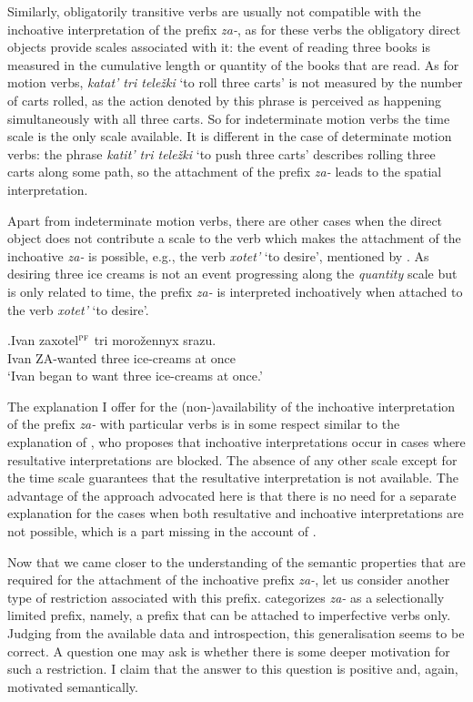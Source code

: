 Similarly, obligatorily transitive verbs are usually not compatible with the inchoative interpretation of the prefix \textit{za-}, as for these verbs the obligatory direct objects provide scales associated with it: the event of reading three books is measured in the cumulative length or quantity of the books that are read. As for motion verbs, \textit{katat' tri tele\v{z}ki} `to roll three carts' is not measured by the number of carts rolled, as the action denoted by this phrase is perceived as happening simultaneously with all three carts. So for indeterminate motion verbs the time scale is the only scale available. It is different in the case of determinate motion verbs: the phrase \textit{katit' tri tele\v{z}ki} `to push three carts' describes rolling three carts along some path, so the attachment of the prefix \textit{za-} leads to the spatial interpretation.

Apart from indeterminate motion verbs, there are other cases when the direct object does not contribute a scale to the verb which makes the attachment of the inchoative \textit{za-} is possible, e.g., the verb \textit{xotet'} `to desire', mentioned by \citet{Braginsky:08}. As desiring three ice creams is not an event progressing along the \textit{quantity} scale but is only related to time, the prefix \textit{za-} is interpreted inchoatively when attached to the verb \textit{xotet'} `to desire'.

\exg.\label{ex:zaxotet}Ivan zaxotel$^{\textsc{pf}}$ tri moro\v{z}ennyx srazu.\\
Ivan ZA-wanted three ice-creams {at once}\\
\trans `Ivan began to want three ice-creams at once.'
\\

The explanation I offer for the (non-)availability of the inchoative interpretation of the prefix \textit{za-} with particular verbs is in some respect similar to the explanation of \citet{Braginsky:08}, who proposes that inchoative interpretations occur in cases where resultative interpretations are blocked. The absence of any other scale except for the time scale guarantees that the resultative interpretation is not available. The advantage of the approach advocated here is that there is no need for a separate explanation for the cases when both resultative and inchoative interpretations are not possible, which is a part missing in the account of \citet{Braginsky:08}.

Now that we came closer to the understanding of the semantic properties that are required for the attachment of the inchoative prefix \textit{za-}, let us consider another type of restriction associated with this prefix. \citet{Tatevosov:09} categorizes \textit{za-} as a selectionally limited prefix, namely, a prefix that can be attached to imperfective verbs only. Judging from the available data and introspection, this generalisation seems to be correct. A question one may ask is whether there is some deeper motivation for such a restriction. I claim that the answer to this question is positive and, again, motivated semantically. 

